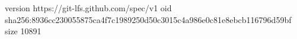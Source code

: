 version https://git-lfs.github.com/spec/v1
oid sha256:8936cc230055875ca4f7c1989250d50c3015c4a986e0c81e8ebcb116796d59bf
size 10891
